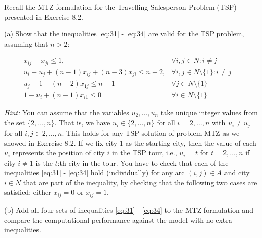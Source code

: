 Recall the MTZ formulation for the Travelling Salesperson Problem (TSP) presented in Exercise 8.2. 

(a) Show that the inequalities \eqref{eq:31} - \eqref{eq:34} are valid for the TSP problem, assuming that $n > 2$:

\begin{align}
&x_{ij} + x_{ji} \leq 1, &\forall i,j \in N : i\neq j\qquad\label{eq:31}\\[5pt]
&u_i - u_j + (n-1)x_{ij} + (n-3)x_{ji} \leq n-2,   &\forall i,j \in N\setminus\{1\} : i \neq j\qquad\label{eq:32}\\[5pt]
&u_j - 1 + (n-2)x_{1j} \leq n - 1 &\forall j \in N\setminus\{1\}\qquad\\[5pt]
&1 - u_i + (n-1)x_{i1} \leq 0 &\forall i \in N\setminus\{1\}\qquad\label{eq:34}
\end{align}

\emph{Hint:} You can assume that the variables $u_2,\dots,u_n$ take unique integer values from the set $\{2,\dots,n\}$. That is, we have $u_i\in \{2,\dots,n\}$ for all $i = 2,\dots,n$ with $u_i \neq u_j$ for all $i,j\in 2,\dots,n$. This holds for any TSP solution of problem MTZ as we showed in Exercise 8.2. If we fix city 1 as the starting city, then the value of each $u_i$ represents the position of city $i$ in the TSP tour, i.e., $u_i = t$ for $t = 2,\dots,n$ if city $i\neq1$ is the $t$:th city in the tour. You have to check that each of the inequalities \eqref{eq:31} - \eqref{eq:34} hold (individually) for any arc $(i,j)\in A$ and city $i\in N$ that are part of the inequality, by checking that the following two cases are satisfied: either $x_{ij} = 0$ or $x_{ij} = 1$.


(b) Add all four sets of inequalities \eqref{eq:31} - \eqref{eq:34} to the MTZ formulation and compare the computational performance against the model with no extra inequalities.
